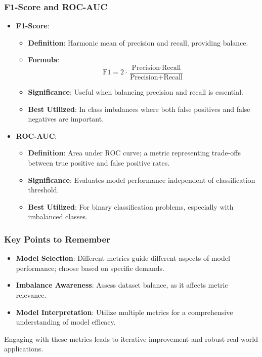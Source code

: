 \documentclass[aspectratio=169]{beamer}
\begin{document}
\begin{frame}[fragile]
    \frametitle{F1-Score and ROC-AUC}
    \begin{itemize}
        \item \textbf{F1-Score}:
        \begin{itemize}
            \item \textbf{Definition}: Harmonic mean of precision and recall, providing balance.
            \item \textbf{Formula}:
            \begin{equation}
            \text{F1} = 2 \cdot \frac{\text{Precision} \cdot \text{Recall}}{\text{Precision} + \text{Recall}}
            \end{equation}
            \item \textbf{Significance}: Useful when balancing precision and recall is essential.
            \item \textbf{Best Utilized}: In class imbalances where both false positives and false negatives are important.
        \end{itemize}
        \item \textbf{ROC-AUC}:
        \begin{itemize}
            \item \textbf{Definition}: Area under ROC curve; a metric representing trade-offs between true positive and false positive rates.
            \item \textbf{Significance}: Evaluates model performance independent of classification threshold.
            \item \textbf{Best Utilized}: For binary classification problems, especially with imbalanced classes.
        \end{itemize}
    \end{itemize}
\end{frame}

\begin{frame}[fragile]
    \frametitle{Key Points to Remember}
    \begin{itemize}
        \item \textbf{Model Selection}: Different metrics guide different aspects of model performance; choose based on specific demands.
        \item \textbf{Imbalance Awareness}: Assess dataset balance, as it affects metric relevance.
        \item \textbf{Model Interpretation}: Utilize multiple metrics for a comprehensive understanding of model efficacy.
    \end{itemize}
    Engaging with these metrics leads to iterative improvement and robust real-world applications.
\end{frame}
\end{document}

